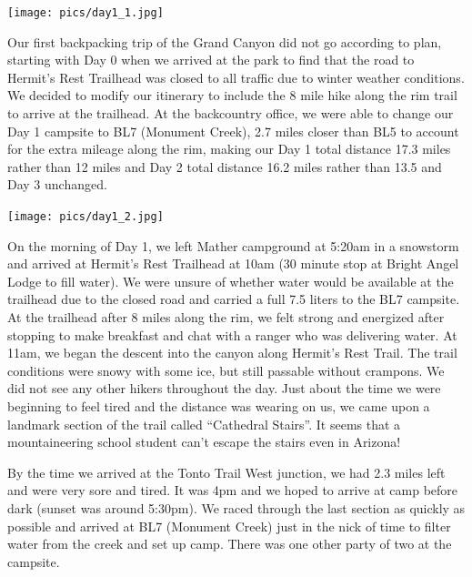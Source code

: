 \documentclass[10pt,a4paper]{article}
\newenvironment{Figure}
  {\par\medskip\noindent\minipage{\linewidth}}
  {\endminipage\par\medskip}
\begin{document}
\begin{multicols}{2}
\begin{Figure}
 \centering
 \texttt{[image: pics/day1\_1.jpg]}
\end{Figure}

Our first backpacking trip of the Grand Canyon did not go according to plan, starting with Day 0 when we arrived at the park to find that the road to Hermit's Rest Trailhead was closed to all traffic due to winter weather conditions. We decided to modify our itinerary to include the 8 mile hike along the rim trail to arrive at the trailhead. At the backcountry office, we were able to change our Day 1 campsite to BL7 (Monument Creek), 2.7 miles closer than BL5 to account for the extra mileage along the rim, making our Day 1 total distance 17.3 miles rather than 12 miles and Day 2 total distance 16.2 miles rather than 13.5 and Day 3 unchanged. \\

\begin{Figure}
 \centering
 \texttt{[image: pics/day1\_2.jpg]}
\end{Figure}

On the morning of Day 1, we left Mather campground at 5:20am in a snowstorm and arrived at Hermit's Rest Trailhead at 10am (30 minute stop at Bright Angel Lodge to fill water). We were unsure of whether water would be available at the trailhead due to the closed road and carried a full 7.5 liters to the BL7 campsite. At the trailhead after 8 miles along the rim, we felt strong and energized after stopping to make breakfast and chat with a ranger who was delivering water. At 11am, we began the descent into the canyon along Hermit's Rest Trail. The trail conditions were snowy with some ice, but still passable without crampons. We did not see any other hikers throughout the day. Just about the time we were beginning to feel tired and the distance was wearing on us, we came upon a landmark section of the trail called “Cathedral Stairs”. It seems that a mountaineering school student can't escape the stairs even in Arizona! 


By the time we arrived at the Tonto Trail West junction, we had 2.3 miles left and were very sore and tired. It was 4pm and we hoped to arrive at camp before dark (sunset was around 5:30pm). We raced through the last section as quickly as possible and arrived at BL7 (Monument Creek) just in the nick of time to filter water from the creek and set up camp. There was one other party of two at the campsite.


\end{multicols}
\end{document}
